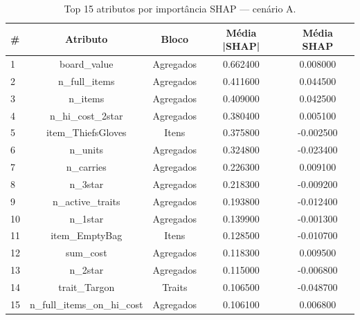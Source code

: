 \begin{table}[htbp]
\caption{Top 15 atributos por importância SHAP — cenário A.}
\label{tab:topA}
\centering
\small
\begin{tabular}{lcccc}
\toprule
\# & Atributo & Bloco & Média |SHAP| & Média SHAP \\
\midrule
1 & board\_value & Agregados & 0.662400 & 0.008000 \\
2 & n\_full\_items & Agregados & 0.411600 & 0.044500 \\
3 & n\_items & Agregados & 0.409000 & 0.042500 \\
4 & n\_hi\_cost\_2star & Agregados & 0.380400 & 0.005100 \\
5 & item\_ThiefsGloves & Itens & 0.375800 & -0.002500 \\
6 & n\_units & Agregados & 0.324800 & -0.023400 \\
7 & n\_carries & Agregados & 0.226300 & 0.009100 \\
8 & n\_3star & Agregados & 0.218300 & -0.009200 \\
9 & n\_active\_traits & Agregados & 0.193800 & -0.012400 \\
10 & n\_1star & Agregados & 0.139900 & -0.001300 \\
11 & item\_EmptyBag & Itens & 0.128500 & -0.010700 \\
12 & sum\_cost & Agregados & 0.118300 & 0.009500 \\
13 & n\_2star & Agregados & 0.115000 & -0.006800 \\
14 & trait\_Targon & Traits & 0.106500 & -0.048700 \\
15 & n\_full\_items\_on\_hi\_cost & Agregados & 0.106100 & 0.006800 \\
\bottomrule
\end{tabular}
\end{table}
